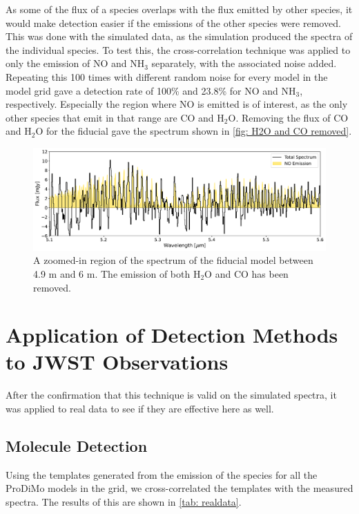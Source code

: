 \documentclass[oneside, single, authoryear, semicolon, 12pt]{lion-msc}
\newcommand{\4}{$_4$}
\newcommand{\3}{$_3$}
\newcommand{\2}{$_2$}
\begin{document}
As some of the flux of a species overlaps with the flux emitted by other species, it would make detection easier if the emissions of the other species were removed. This was done with the simulated data, as the simulation produced the spectra of the individual species. To test this, the cross-correlation technique was applied to only the emission of NO and NH\3 separately, with the associated noise added. Repeating this 100 times with different random noise for every model in the model grid gave a detection rate of 100\% and 23.8\% for NO and NH\3, respectively.  Especially the region where NO is emitted is of interest, as the only other species that emit in that range are CO and H\2O. Removing the flux of CO and H\2O for the fiducial gave the spectrum shown in \autoref{fig: H2O and CO removed}.

\begin{figure}[H]
    \centering
    \includegraphics[width=\linewidth]{Figures/H2O_CO_removed.pdf}
    \caption{A zoomed-in region of the spectrum of the fiducial model between 4.9 \textmu m and 6 \textmu m. The emission of both H\2O and CO has been removed.}
    \label{fig: H2O and CO removed}
\end{figure}

\section{Application of Detection Methods to JWST Observations}
After the confirmation that this technique is valid on the simulated spectra, it was applied to real data to see if they are effective here as well.

\subsection{Molecule Detection}
Using the templates generated from the emission of the species for all the ProDiMo models in the grid, we cross-correlated the templates with the measured spectra. The results of this are shown in \autoref{tab: realdata}.
\end{document}
